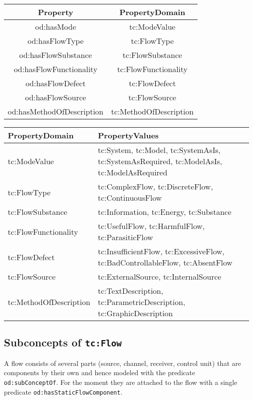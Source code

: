 \documentclass[a4paper,11pt]{article}
\begin{document}
    \begin{center}
    \begin{tabular}{|c|c|}\hline
        Property & PropertyDomain \\\hline
        od:hasMode & tc:ModeValue \\
        od:hasFlowType & tc:FlowType  \\
        od:hasFlowSubstance & tc:FlowSubstance  \\
        od:hasFlowFunctionality & tc:FlowFunctionality  \\
        od:hasFlowDefect & tc:FlowDefect  \\
        od:hasFlowSource & tc:FlowSource  \\
        od:hasMethodOfDescription & tc:MethodOfDescription \\\hline 
    \end{tabular}
    \end{center}

    \begin{center}
    \begin{tabular}{|l|p{10cm}|}\hline
        PropertyDomain & PropertyValues \\\hline
        tc:ModeValue & tc:System, tc:Model, tc:SystemAsIs, tc:SystemAsRequired,
        tc:ModelAsIs, tc:ModelAsRequired \\
        tc:FlowType & tc:ComplexFlow, tc:DiscreteFlow, tc:ContinuousFlow \\
        tc:FlowSubstance & tc:Information, tc:Energy, tc:Substance \\
        tc:FlowFunctionality & tc:UsefulFlow, tc:HarmfulFlow, tc:ParasiticFlow  \\
        tc:FlowDefect & tc:InsufficientFlow, tc:ExcessiveFlow,
        tc:BadControllableFlow, tc:AbsentFlow \\ 
        tc:FlowSource & tc:ExternalSource, tc:InternalSource  \\
        tc:MethodOfDescription & tc:TextDescription, tc:ParametricDescription,
        tc:GraphicDescription \\\hline 
    \end{tabular}
    \end{center}

    \subsection{Subconcepts of \texttt{tc:Flow}}

    A flow consists of several parts (source, channel, receiver, control unit)
    that are components by their own and hence modeled with the predicate
    \texttt{od:subConceptOf}. For the moment they are attached to the flow with a
    single predicate \texttt{od:hasStaticFlowComponent}.
\end{document}
